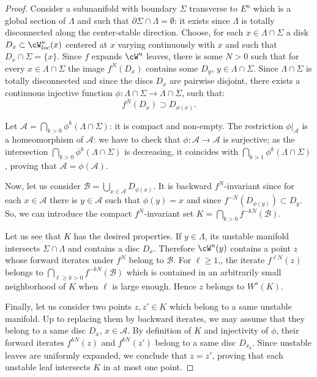 \documentclass[a4paper,11pt]{amsart}
\numberwithin{equation}{section}     %
\def\cA{\mathcal{A}}  \def\cG{\mathcal{G}} \def\cM{\mathcal{M}} \def\cS{\mathcal{S}}
\def\cB{\mathcal{B}}  \def\cH{\mathcal{H}} \def\cN{\mathcal{N}} \def\cT{\mathcal{T}}
\theoremstyle{definition}
\theoremstyle{remark}
\begin{document}
\begin{proof}
Consider a submanifold with boundary $\Sigma$ transverse to $E^u$ which is a global section of $\Lambda$ and such that $\partial \Sigma \cap \Lambda = \emptyset$: it exists since $\Lambda$ is totally disconnected along the center-stable direction. Choose, for each $x \in \Lambda \cap \Sigma$ a disk $D_x \subset \cW^u_{loc}(x)$ centered at $x$ varying continuously with $x$  and such that $D_x\cap \Sigma=\{x\}$. Since $f$ expands $\cW^u$ leaves, there is some $N>0$ such that for every $x \in \Lambda \cap \Sigma$ the image $f^N(D_x)$ contains some $D_y$, $y \in \Lambda \cap \Sigma$. 
Since $\Lambda \cap \Sigma$ is totally disconnected and since the discs $D_x$ are pairwise disjoint, there exists a continuous injective function $\phi: \Lambda \cap \Sigma \to \Lambda \cap \Sigma$,  such that:  
$$ f^{N} (D_x) \supset D_{\phi(x)} . $$
 
Let $\cA = \bigcap_{k > 0} \phi^k (\Lambda \cap \Sigma)$: it is compact and non-empty. The restriction $\phi|_\cA$ is a homeomorphism of $\cA$: we have to check that $\phi\colon \cA\to \cA$ is surjective; as the intersection $\bigcap_{k > 0} \phi^k (\Lambda \cap \Sigma)$ is decreasing, it coincides with $\bigcap_{k > 1} \phi^k (\Lambda \cap \Sigma)$, proving that $\cA=\phi(\cA)$.

Now, let us consider $\cB = \bigcup_{x \in \cA} D_{\phi(x)}$. It is backward $f^N$-invariant since
for each $x\in \cA$ there is $y \in \cA$ such that $\phi(y)=x$ and since $f^{-N}(D_{\phi(y)}) \subset D_y$.  So, we can introduce the compact $f^N$-invariant set $ K = \bigcap_{k>0} f^{-kN}(\cB)$.


Let us see that $K$ has the desired properties. If $y \in \Lambda$, its unstable manifold intersects $\Sigma \cap \Lambda$ and contains a disc $D_x$. Therefore $\cW^u(y)$ contains a point $z$ whose forward iterates under $f^N$ belong to $\cB$.
For $\ell\geq 1$,, the iterate $f^{\ell N}(z)$ belongs to $\bigcap_{\ell\geq k>0} f^{-kN}(\cB)$ which is contained in an arbitrarily small neighborhood of $K$ when $\ell$ is large enough. Hence $z$ belongs to $W^s(K)$.

Finally, let us consider two points $z,z'\in K$ which belong to a same unstable manifold.
Up to replacing them by backward iterates, we may assume that they belong to a same disc $D_x$, $x\in \cA$.
By definition of $K$ and injectivity of $\phi$, their forward iterates $f^{kN}(z)$ and $f^{kN}(z')$ belong to a same disc $D_{x_k}$.
Since unstable leaves are uniformly expanded, we conclude that $z=z'$, proving that each unstable leaf intersects $K$ in at most one point.\end{proof}
\end{document}
